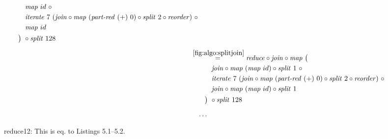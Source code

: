 \begin{figure*}[t]
\begin{align*}
\begin{aligned}
    &\qquad\quad\map\ id\ \circ \\
    &\qquad\quad\iterateN\ 7\ (\join \circ \map\ (\partRed\ (+)\ 0) \circ \splitN\ 2\circ \reorder)\ \circ\\
    &\qquad\quad\map\ id\\
    &\qquad\big)\ \circ \splitN\ 128
  \end{aligned}\\[.5em]
%
  &\hspace{-2em}\quad\begin{aligned}
    &\overset{\ref{fig:algo:splitjoin}}{=\hspace{.2em}}
      \reduce \circ \join \circ \map\ \big(\\
    &\qquad\quad\join \circ \map\ (\map\ id) \circ \splitN\ 1\ \circ\\
    &\qquad\quad\iterateN\ 7\ (\join \circ \map\ (\partRed\ (+)\ 0) \circ \splitN\ 2\circ \reorder)\ \circ\\
    &\qquad\quad\join \circ \map\ (\map\ id) \circ \splitN\ 1\\
    &\qquad\big)\ \circ \splitN\ 128
  \end{aligned}\\[.5em]
%
  &\ldots
\end{align*}
\caption{reduce12: This is eq. to Listings 5.1--5.2.}
\end{figure*}

